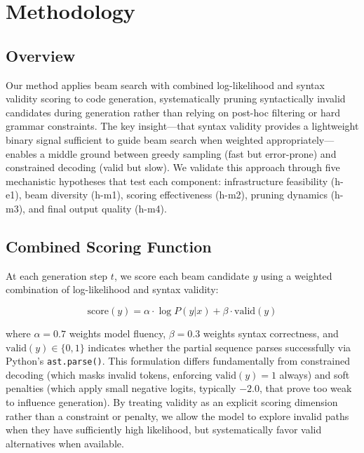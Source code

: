 \section{Methodology}

\subsection{Overview}

Our method applies beam search with combined log-likelihood and syntax validity scoring to code generation, systematically pruning syntactically invalid candidates during generation rather than relying on post-hoc filtering or hard grammar constraints. The key insight---that syntax validity provides a lightweight binary signal sufficient to guide beam search when weighted appropriately---enables a middle ground between greedy sampling (fast but error-prone) and constrained decoding (valid but slow). We validate this approach through five mechanistic hypotheses that test each component: infrastructure feasibility (h-e1), beam diversity (h-m1), scoring effectiveness (h-m2), pruning dynamics (h-m3), and final output quality (h-m4).

\subsection{Combined Scoring Function}

At each generation step $t$, we score each beam candidate $y$ using a weighted combination of log-likelihood and syntax validity:

\begin{equation}
\text{score}(y) = \alpha \cdot \log P(y | x) + \beta \cdot \text{valid}(y)
\end{equation}

where $\alpha=0.7$ weights model fluency, $\beta=0.3$ weights syntax correctness, and $\text{valid}(y) \in \{0, 1\}$ indicates whether the partial sequence parses successfully via Python's \texttt{ast.parse()}. This formulation differs fundamentally from constrained decoding (which masks invalid tokens, enforcing $\text{valid}(y)=1$ always) and soft penalties (which apply small negative logits, typically $-2.0$, that prove too weak to influence generation). By treating validity as an explicit scoring dimension rather than a constraint or penalty, we allow the model to explore invalid paths when they have sufficiently high likelihood, but systematically favor valid alternatives when available.

